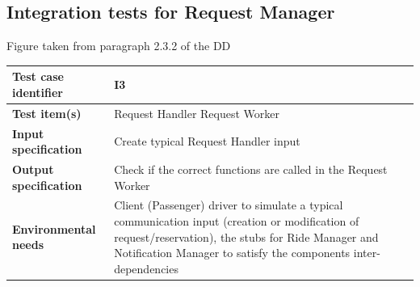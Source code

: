 \documentclass[a4paper,11pt]{report} %
\begin{document}
		\subsection{Integration tests for Request Manager}
		\begin{minipage}{\linewidth}
		\end{minipage}
		\begin{center}
			Figure taken from paragraph 2.3.2 of the DD
		\end{center} 
		\begin{center}
				\renewcommand{\arraystretch}{1.2}
				\setlength{\tabcolsep}{24pt}
			\begin{tabular}{ l  p{9cm}}\hline
				\textbf{Test case identifier} & I3\\\hline
				\textbf{Test item(s)} & Request Handler \textrightarrow Request Worker\\\hline
				\textbf{Input specification} & Create typical Request Handler input \\\hline
				\textbf{Output specification} & Check if the correct functions are called in the Request Worker\\\hline
				\textbf{Environmental needs} & Client (Passenger) driver to simulate a typical communication input (creation or modification of request/reservation), the stubs for Ride Manager and Notification Manager to satisfy the components inter-dependencies\\\hline
			\end{tabular}
		\end{center}	
		\bigskip	
\end{document}
